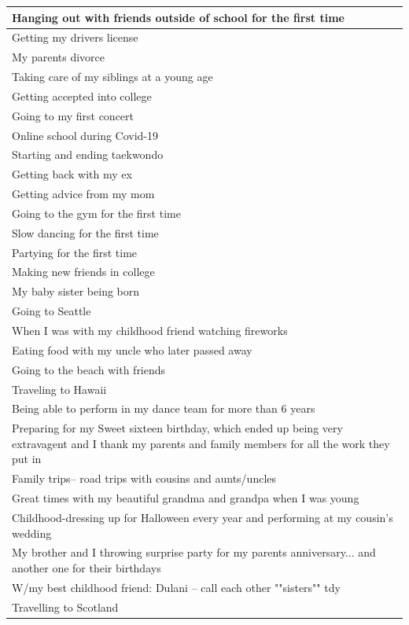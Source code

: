 \documentclass[
  .7em,
  letterpaper,
  DIV=11,
  numbers=noendperiod]{scrartcl}
\begin{document}
\begin{table}
\begin{tabular}{l}
Hanging out with friends outside of school for the first time\\
\hline
Getting my drivers license\\
\hline
My parents divorce\\
\hline
Taking care of my siblings at a young age\\
\hline
Getting accepted into college\\
\hline
Going to my first concert\\
\hline
Online school during Covid-19\\
\hline
Starting and ending taekwondo\\
\hline
Getting back with my ex\\
\hline
Getting advice from my mom\\
\hline
Going to the gym for the first time\\
\hline
Slow dancing for the first time\\
\hline
Partying for the first time\\
\hline
Making new friends in college\\
\hline
My baby sister being born\\
\hline
Going to Seattle\\
\hline
When I was with my childhood friend watching fireworks\\
\hline
Eating food with my uncle who later passed away\\
\hline
Going to the beach with friends\\
\hline
Traveling to Hawaii\\
\hline
Being able to perform in my dance team for more than 6 years\\
\hline
Preparing for my Sweet sixteen birthday, which ended up being very extravagent and I thank my parents and family members for all the work they put in\\
\hline
Family trips-- road trips with cousins and aunts/uncles\\
\hline
Great times with my beautiful grandma and grandpa when I was young\\
\hline
Childhood-dressing up for Halloween every year and performing at my cousin's wedding\\
\hline
My brother and I throwing surprise party for my parents anniversary... and another one for their birthdays\\
\hline
W/my best childhood friend: Dulani -- call each other ""sisters"" tdy\\
\hline
Travelling to Scotland\\

\end{tabular}
\end{table}
\end{document}
